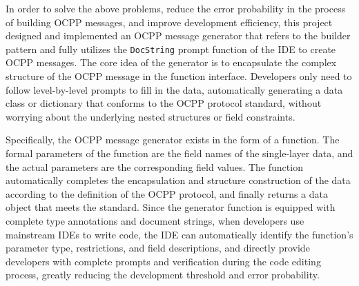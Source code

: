 \documentclass[
	english,
	ruledheaders=section,%
	class=report,%
	thesis={type=Report},%
	accentcolor=9c,%
	custommargins=true,%
	marginpar=false,%
	parskip=half-,%
	fontsize=11pt,%
	logofile={img/tuda_logo.pdf}, %
]{tudapub}
\begin{document}
In order to solve the above problems, reduce the error probability in the process of building \ac{OCPP} messages, and improve development efficiency, this project designed and implemented an \ac{OCPP} message generator that refers to the builder pattern\cite{DesignPatterns} and fully utilizes the \texttt{DocString} prompt function of the IDE to create \ac{OCPP} messages. The core idea of the generator is to encapsulate the complex structure of the \ac{OCPP} message in the function interface. Developers only need to follow level-by-level prompts to fill in the data, automatically generating a data class or dictionary that conforms to the \ac{OCPP} protocol standard, without worrying about the underlying nested structures or field constraints.


Specifically, the \ac{OCPP} message generator exists in the form of a function. The formal parameters of the function are the field names of the single-layer data, and the actual parameters are the corresponding field values. The function automatically completes the encapsulation and structure construction of the data according to the definition of the \ac{OCPP} protocol, and finally returns a data object that meets the standard. Since the generator function is equipped with complete type annotations and document strings, when developers use mainstream IDEs to write code, the IDE can automatically identify the function's parameter type, restrictions, and field descriptions, and directly provide developers with complete prompts and verification during the code editing process, greatly reducing the development threshold and error probability.

\end{document}
